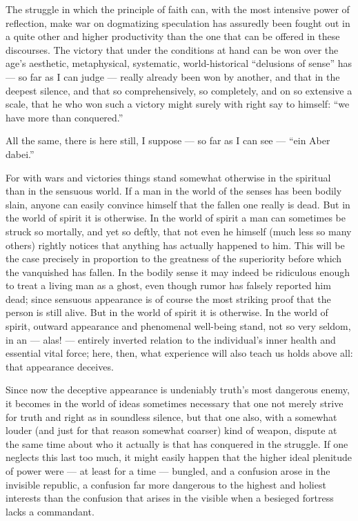 \documentclass[12pt,a4paper]{book}
\begin{document}
The struggle in which the principle of faith can, with the most intensive power
of reflection, make war on dogmatizing speculation has assuredly been fought
out in a quite other and higher productivity than the one that can be offered
in these discourses. The victory that under the conditions at hand can be won
over the age's aesthetic, metaphysical, systematic, world-historical
``delusions of sense'' has --- so far as I can judge --- really already been
won by another, and that in the deepest silence, and that so comprehensively,
so completely, and on so extensive a
scale, that he who won such a victory might surely with right say to himself:
``we have more than conquered.''

All the same, there is here still, I suppose --- so far as I can see --- ``ein
Aber dabei.''

For with wars and victories things stand somewhat otherwise in the spiritual
than in the sensuous world. If a man in the world of the senses has been
bodily slain, anyone can easily convince himself that the fallen one really is
dead. But in the world of spirit it is otherwise. In the world of spirit a man
can sometimes be struck so mortally, and yet so deftly, that not even he
himself (much less so many others) rightly notices that anything has actually
happened to him. This will be the case precisely in proportion to the greatness
of the superiority before which the vanquished has fallen. In the bodily sense
it may indeed be ridiculous enough to treat a living man as a ghost, even
though rumor has falsely reported him dead; since sensuous appearance is of
course the most striking proof that the person is still alive. But in the world
of spirit it is otherwise. In the world of spirit, outward appearance and
phenomenal well-being stand, not so very seldom, in an --- alas! --- entirely
inverted relation to the individual's inner health and essential vital force;
here, then, what experience will also teach us holds above all: that appearance
deceives.

Since now the deceptive appearance is undeniably truth's most dangerous enemy,
it becomes in the world of ideas sometimes necessary that one not merely strive
for truth and right as in soundless silence, but that one also, with a somewhat
louder (and just for that reason somewhat coarser) kind of weapon, dispute at
the same time about who it actually is that has conquered in the struggle. If
one neglects this last too much, it might easily happen that the higher ideal
plenitude of power were --- at least for a time --- bungled, and a confusion
arose in the invisible republic, a confusion far more dangerous to the highest
and holiest interests than the confusion that arises in the visible when a
besieged fortress lacks a commandant.
\end{document}
